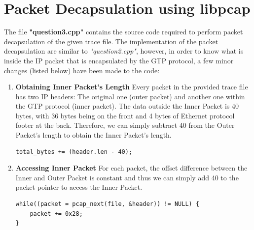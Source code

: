 \documentclass[a4paper,11pt]{article}
\begin{document}
\section{Packet Decapsulation using libpcap}
The file \textbf{"question3.cpp"} contains the source code required to perform packet decapsulation of the given trace file. The implementation of the packet decapsulation are similar to \textit{"question2.cpp"}, however, in order to know what is inside the IP packet that is encapsulated by the GTP protocol,  a few minor changes (listed below)  have been made to the code:
\begin{enumerate}
\item \textbf{Obtaining Inner Packet's Length}
\newline 
Every packet in the provided trace file has two IP headers: The original one (outer packet) and another one within the GTP protocol (inner packet). The data outside the Inner Packet is 40 bytes, with 36 bytes being on the front and 4 bytes of Ethernet protocol footer at the back. Therefore, we can simply subtract 40 from the Outer Packet's length to obtain the Inner Packet's length.
\begin{mdframed}[backgroundcolor=light-gray, roundcorner=30pt,leftmargin=1, rightmargin=1, innerleftmargin=5, innertopmargin=-3,innerbottommargin=5, outerlinewidth=1, linecolor=light-gray]
\begin{lstlisting}
total_bytes += (header.len - 40);
\end{lstlisting}
\end{mdframed}
\item \textbf{Accessing Inner Packet}
\newline
For each packet, the offset difference between the Inner and Outer Packet is constant and thus we can simply add 40 to the packet pointer to access the Inner Packet.
\begin{mdframed}[backgroundcolor=light-gray, roundcorner=30pt,leftmargin=1, rightmargin=1, innerleftmargin=5, innertopmargin=-3,innerbottommargin=5, outerlinewidth=1, linecolor=light-gray]
\begin{lstlisting}
while((packet = pcap_next(file, &header)) != NULL) {
	packet += 0x28;
}
\end{lstlisting}
\end{mdframed}
\end{enumerate}
\end{document}
